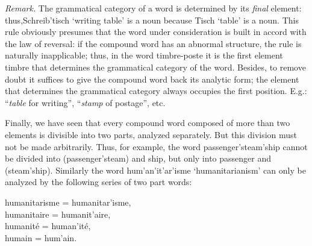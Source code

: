 {{      \emph{Remark.} The grammatical category of a word is determined
      by its \emph{final} element: thus,\linebreak \textup{Schreib'tisch}
      `writing table' is a noun because \textup{Tisch} `table' is a
      noun. This rule obviously presumes that the word under
      consideration is built in accord with the law of reversal: if
      the compound word has an abnormal structure, the rule is
      naturally inapplicable; thus, in the word \textup{timbre-poste}
      it is the first element \textup{timbre} that determines the
      grammatical category of the word. Besides, to remove doubt it
      suffices to give the compound word back its analytic form; the
      element that determines the grammatical category always occupies
      the first position. E.g.: ``\emph{table} for writing'',
      ``\emph{stamp} of postage'', etc.

      Finally, we have seen that every compound word composed of more
      than two elements is divisible into two parts, analyzed
      separately. But this division must not be made
      arbitrarily. Thus, for example, the word
      \textup{passenger'steam'ship} cannot be divided into
      \textup{(passenger'steam)} and \textup{ship}, but only into
      \textup{passenger} and \textup{(steam'ship)}. Similarly the word
      \textup{hum'an'it'ar'isme} `humanitarianism' can only be
      analyzed by the following series of two part words:
      \begin{center}
        \textup{humanitarisme} = \textup{humanitar'isme},\\
        \textup{humanitaire} = \textup{humanit'aire},\\
        \textup{humanité} = \textup{human'ité},\\
        \textup{humain} = \textup{hum'ain}.
      \end{center}
   
    }
  }  

